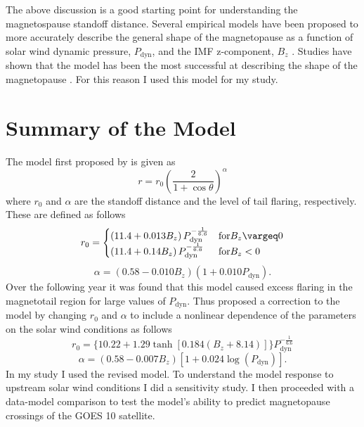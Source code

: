 \documentclass[12pt, letterpaper]{article}
\begin{document}
The above discussion is a good starting point for understanding the magnetospause standoff distance. Several empirical models have been proposed to more accurately describe the general shape of the magnetopause as a function of solar wind dynamic pressure, $P_{\text{dyn}}$, and the IMF z-component, $B_{z}$ \citep{Petrinec93} \citep{Shue97} \citep{Shue98} \citep{Kuznetsov98} \citep{Roelof98}. Studies have shown that the \citet {Shue98} model has been the most successful at describing the shape of the magnetopause \citep{Shue00}. For this reason I used this model for my study. 

\section{Summary of the Model}
\label{sec:summary} 
The model first proposed by \citet{Shue97} is given as 
\begin{equation}
r = r_{0} \left( \frac{2}{1 + \cos \theta } \right) ^{\alpha}
\end{equation}
where $r_{0}$ and $\alpha$ are the standoff distance and the level of tail flaring, respectively. These are defined as follows
\begin{equation}
 r_{0} =
  \begin{cases}
   \left( 11.4 + 0.013 B_{z} \right) P_{\text{dyn}}^{-\frac{1}{6.6}} & \text{for} B_{z} \vargeq 0 \\
   \left( 11.4 + 0.14 B_{z} \right) P_{\text{dyn}}^{-\frac{1}{6.6}} & \text{for} B_{z} < 0 
  \end{cases}
\end{equation}
\begin{equation}
\alpha = \left( 0.58 - 0.010 B_{z} \right) \left( 1 + 0.010 P_{\text{dyn}} \right ).
\end{equation}
Over the following year it was found that this model caused excess flaring in the magnetotail region for large values of $P_{\text{dyn}}$. Thus \citet{Shue98} proposed a correction to the model by changing $r_{0}$ and $\alpha$ to include a nonlinear dependence of the parameters on the solar wind conditions as follows
\begin{equation}
r_{0} = \lbrace 10.22 + 1.29 \tanh \left[ 0.184 \left( B_{z} + 8.14 \right) \right] \rbrace P_{\text{dyn}}^{-\frac{1}{6.6}}
\end{equation}
\begin{equation}
\alpha = \left( 0.58 - 0.007 B_{z} \right) \left[ 1 + 0.024 \log \left( P_{\text{dyn}} \right ) \right].
\end{equation}
In my study I used the \citet{Shue98} revised model. To understand the model response to upstream solar wind conditions I did a sensitivity study. I then proceeded with a data-model comparison to test the model's ability to predict magnetopause crossings of the GOES 10 satellite. 
\end{document}
